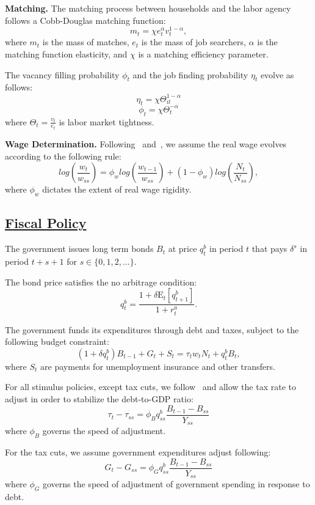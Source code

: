 \documentclass[\PathToRoot/\ProjectName]{subfiles}
\begin{document}
\textbf{Matching.} The matching process between households and the labor agency follows a Cobb-Douglas matching function:
\[
  m_{t} = \chi e_{t}^{\alpha} v_{t}^{1-\alpha},
\]
where $m_{t}$ is the mass of matches, $e_{t}$ is the mass of job searchers, $\alpha$ is the matching function elasticity, and $\chi$ is a matching efficiency parameter.

The vacancy filling probability \( \phi_t \) and the job finding probability \( \eta_t \) evolve as follows:
\[
  \eta_{t} = \chi \Theta_{it}^{1-\alpha}
\]
\[
  \phi_{t} = \chi \Theta_{t}^{-\alpha}
\]
where $\Theta_{t} = \frac{v_{t}}{e_{t}}$ is labor market tightness.

\textbf{Wage Determination.} Following~\cite{Gornemann2021} and~\cite{Blanchard2010}, we assume the real wage evolves according to the following rule:
\[
  log\left(\frac{w_{t}}{w_{ss}}\right)  = \phi_w log\left( \frac{ w_{t-1}}{ w_{ss}} \right) +   (1 - \phi_w) log\left( \frac{N_{t}}{N_{ss}}\right),
\]
where $\phi_w$ dictates the extent of real wage rigidity.

\subsection{\href{https://econ-ark.github.io/HAFiscal/\#sec:hank-fiscal-policy}{Fiscal Policy}}\label{sec:hank-fiscal-policy}

The government issues long term bonds $B_{t}$ at price $q^{b}_{t}$ in period $t$ that pays $\delta^{s}$ in period $t+s+1$ for $s \in \{0,1,2,\ldots\}$.

The bond price satisfies the no arbitrage condition:
\[
  q^{b}_{t} = \frac{ 1  + \delta \mathrm{E}_{t}[q^{b}_{t+1}]}{1+r^{a}_{t}}.
\]

The government funds its expenditures through debt and taxes, subject to the following budget constraint:
\[
  (1 + \delta q^{b}_{t})B_{t-1} + G_{t}  + S_{t} = \tau_{t} w_{t} N_{t}+ q^{b}_{t}B_{t},
\]
where $S_{t}$ are payments for unemployment insurance and other transfers.

For all stimulus policies, except tax cuts, we follow~\cite{arsJumpsHumps} and allow the tax rate to adjust in order to stabilize the debt-to-GDP ratio:
\[
  \tau_{t} - \tau_{ss} = \phi_{B} q^{b}_{ss} \frac{B_{t-1} - B_{ss} }{Y_{ss}}
\]
where $\phi_{B}$ governs the speed of adjustment.

For the tax cuts, we assume government expenditures adjust following:
\[
  G_{t} - G_{ss} = \phi_{G} q^{b}_{ss} \frac{B_{t-1} - B_{ss} }{Y_{ss}}
\]
where $\phi_{G}$ governs the speed of adjustment of government spending in response to debt.
\end{document}
